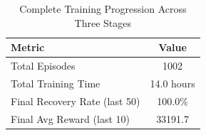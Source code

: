 \begin{table}[htbp]
\centering
\caption{Complete Training Progression Across Three Stages}
\label{tab:training_progression}
\begin{tabular}{lc}
\toprule
\textbf{Metric} & \textbf{Value} \\
\midrule
Total Episodes & 1002 \\
Total Training Time & 14.0 hours \\
Final Recovery Rate (last 50) & 100.0\% \\
Final Avg Reward (last 10) & 33191.7 \\
\bottomrule
\end{tabular}
\end{table}
